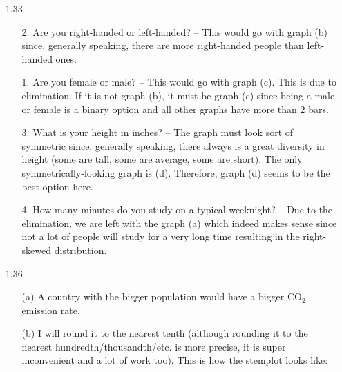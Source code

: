 \documentclass[11pt, a4paper]{article}
\begin{document}
\begin{itemize}
\item[1.33]
\begin{itemize}
\item[2.]
Are you right-handed or left-handed? -- This would go with graph (b)
since, generally speaking, there are more right-handed people than left-handed ones.

\item[1.]
Are you female or male? -- This would go with graph (c). This is due to elimination.
If it is not graph (b), it must be graph (c) since being a male or female is a binary option
and all other graphs have more than $2$ bars.

\item[3.]
What is your height in inches? -- The graph must look sort of symmetric since, generally speaking,
there always is a great diversity in height (some are tall, some are average, some are short). The only
symmetrically-looking graph is (d). Therefore, graph (d) seems to be the best option here.

\item[4.]
How many minutes do you study on a typical weeknight? -- Due to the elimination, we are left with the
graph (a) which indeed makes sense since not a lot of people will study for a very long time
resulting in the right-skewed distribution.
\end{itemize}

\item[]
\item[]

\item[1.36]
\begin{itemize}
\item[(a)]
A country with the bigger population would have a bigger CO$_2$ emission rate.

\item[]

\item[(b)]
I will round it to the nearest tenth (although rounding it to the nearest hundredth/thousandth/etc. is more precise,
it is super inconvenient and a lot of work too). This is how the stemplot looks like:


\end{itemize}
\end{itemize}
\end{document}
